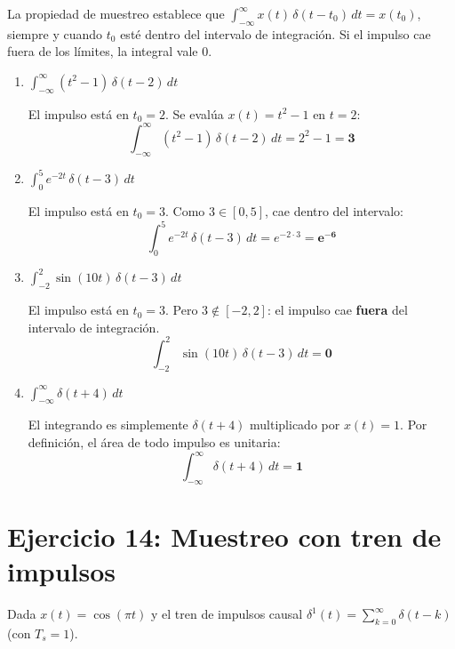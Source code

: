 \documentclass[10pt,a4paper]{article}
\begin{document}
	La propiedad de muestreo establece que $\int_{-\infty}^{\infty} x(t)\,\delta(t-t_0)\,dt = x(t_0)$, siempre y cuando $t_0$ esté dentro del intervalo de integración. Si el impulso cae fuera de los límites, la integral vale $0$.
	
	\begin{enumerate}[label=\textbf{\alph*)}]
		\item $\displaystyle\int_{-\infty}^{\infty} (t^2-1)\,\delta(t-2)\,dt$
		
		El impulso está en $t_0=2$. Se evalúa $x(t)=t^2-1$ en $t=2$:
		\[
		\int_{-\infty}^{\infty} (t^2-1)\,\delta(t-2)\,dt = 2^2 - 1 = \mathbf{3}
		\]
		
		\item $\displaystyle\int_{0}^{5} e^{-2t}\,\delta(t-3)\,dt$
		
		El impulso está en $t_0=3$. Como $3 \in [0,5]$, cae dentro del intervalo:
		\[
		\int_{0}^{5} e^{-2t}\,\delta(t-3)\,dt = e^{-2\cdot 3} = \mathbf{e^{-6}}
		\]
		
		\item $\displaystyle\int_{-2}^{2} \sin(10t)\,\delta(t-3)\,dt$
		
		El impulso está en $t_0=3$. Pero $3 \notin [-2,2]$: el impulso cae \textbf{fuera} del intervalo de integración.
		\[
		\int_{-2}^{2} \sin(10t)\,\delta(t-3)\,dt = \mathbf{0}
		\]
		
		\item $\displaystyle\int_{-\infty}^{\infty} \delta(t+4)\,dt$
		
		El integrando es simplemente $\delta(t+4)$ multiplicado por $x(t)=1$. Por definición, el área de todo impulso es unitaria:
		\[
		\int_{-\infty}^{\infty} \delta(t+4)\,dt = \mathbf{1}
		\]
	\end{enumerate}

	\section*{Ejercicio 14: Muestreo con tren de impulsos}
	
	Dada $x(t) = \cos(\pi t)$ y el tren de impulsos causal $\delta^1(t) = \sum_{k=0}^{\infty}\delta(t-k)$ (con $T_s=1$).
	
\end{document}
